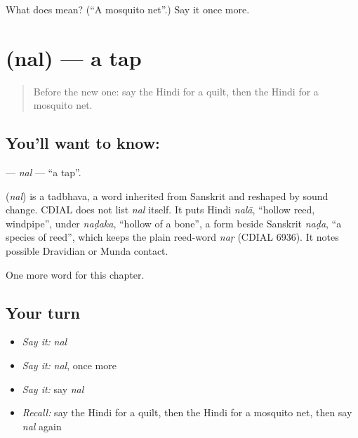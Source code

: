 \begin{tcolorbox}[breakable,colback=teal!4,colframe=teal!35!black,title={Before you move on}]
What does  mean? (\textquotedblleft{}A mosquito net\textquotedblright{}.) Say it once more.
\end{tcolorbox}
\section[\texorpdfstring{\hi{नल} (nal)}{नल (nal)}]{ (nal) — a tap}

\label{lesson:HI-C267-nal}



\begin{quote}
Before the new one: say the Hindi for a quilt, then the Hindi for a mosquito net.
\end{quote}

\subsection*{You'll want to know: }
\textbf{} — \emph{nal} — \textquotedblleft{}a tap\textquotedblright{}.

\begin{cousinweb}
\textbf{} (\emph{nal}) is a tadbhava, a word inherited from Sanskrit and reshaped by sound change. CDIAL does not list \emph{nal} itself. It puts Hindi \emph{nalā}, \textquotedblleft{}hollow reed, windpipe\textquotedblright{}, under \emph{naḍaka}, \textquotedblleft{}hollow of a bone\textquotedblright{}, a form beside Sanskrit \emph{naḍa}, \textquotedblleft{}a species of reed\textquotedblright{}, which keeps the plain reed-word \emph{naṛ} (CDIAL 6936). It notes possible Dravidian or Munda contact.
\end{cousinweb}

\begin{grammarlens}[title={What you've built}]
One more word for this chapter.
\end{grammarlens}

\subsection*{Your turn}
\begin{itemize}
\raggedright
  \item \emph{Say it:} \emph{nal}
  \item \emph{Say it:} \emph{nal}, once more
  \item \emph{Say it:} say \emph{nal}
  \item \emph{Recall:} say the Hindi for a quilt, then the Hindi for a mosquito net, then say \emph{nal} again
\end{itemize}

